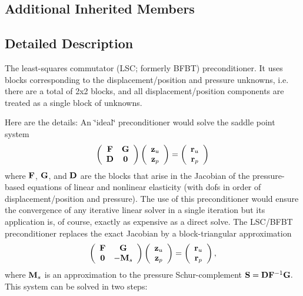 \subsection*{Additional Inherited Members}


\subsection{Detailed Description}
The least-\/squares commutator (L\+SC; formerly B\+F\+BT) preconditioner. It uses blocks corresponding to the displacement/position and pressure unknowns, i.\+e. there are a total of 2x2 blocks, and all displacement/position components are treated as a single block of unknowns. 

Here are the details\+: An \char`\"{}ideal\char`\"{} preconditioner would solve the saddle point system \[ \left( \begin{array}{cc} {\bf F} & {\bf G} \\ {\bf D} & {\bf 0} \end{array} \right) \left( \begin{array}{c} {\bf z}_u \\ {\bf z}_p \end{array} \right) = \left( \begin{array}{c} {\bf r}_u \\ {\bf r}_p \end{array} \right) \] where $ {\bf F}$, $ {\bf G} $, and $ {\bf D}$ are the blocks that arise in the Jacobian of the pressure-\/based equations of linear and nonlinear elasticity (with dofs in order of displacement/position and pressure). The use of this preconditioner would ensure the convergence of any iterative linear solver in a single iteration but its application is, of course, exactly as expensive as a direct solve. The L\+S\+C/\+B\+F\+BT preconditioner replaces the exact Jacobian by a block-\/triangular approximation \[ \left( \begin{array}{cc} {\bf F} & {\bf G} \\ {\bf 0} & -{\bf M}_s \end{array} \right) \left( \begin{array}{c} {\bf z}_u \\ {\bf z}_p \end{array} \right) = \left( \begin{array}{c} {\bf r}_u \\ {\bf r}_p \end{array} \right), \] where ${\bf M}_s$ is an approximation to the pressure Schur-\/complement $ {\bf S} = {\bf D} {\bf F}^{-1}{\bf G}. $ This system can be solved in two steps\+:
